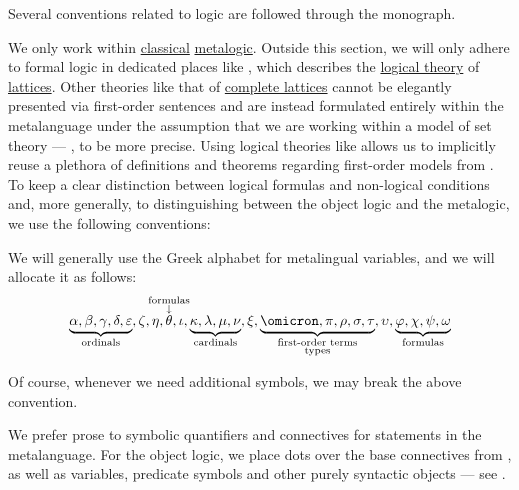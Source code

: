 \begin{remark}\label{rem:mathematical_logic_conventions}
  Several conventions related to logic are followed through the monograph.

  We only work within \hyperref[con:classical_logic]{classical} \hyperref[con:metalogic]{metalogic}. Outside this section, we will only adhere to formal logic in dedicated places like , which describes the \hyperref[def:logical_theory]{logical theory} of \hyperref[def:lattice]{lattices}. Other theories like that of \hyperref[def:complete_lattice]{complete lattices} cannot be elegantly presented via first-order sentences and are instead formulated entirely within the metalanguage under the assumption that we are working within a model of set theory --- \hyperref[def:axiom_of_universes]{}, to be more precise. Using logical theories like  allows us to implicitly reuse a plethora of definitions and theorems regarding first-order models from . To keep a clear distinction between logical formulas and non-logical conditions and, more generally, to distinguishing between the object logic and the metalogic, we use the following conventions:

  \begin{thmenum}
     We will generally use the Greek alphabet for metalingual variables, and we will allocate it as follows:
    \begin{equation*}
      \underbrace{\alpha, \beta, \gamma, \delta, \varepsilon}_{\T{ordinals}},
      \zeta, \eta,
      \overset{ \mathclap{ \substack{ \T{formulas} \\ \downarrow } } }{\theta},
      \iota,
      \underbrace{\kappa, \lambda, \mu, \nu}_{\T{cardinals}},
      \xi,
      \underbrace{\omicron, \pi, \rho, \sigma, \tau}_{\substack{\T{first-order terms} \\ \T{types}}},
      \upsilon,
      \underbrace{\varphi, \chi, \psi, \omega}_{\T{formulas}}
    \end{equation*}

    Of course, whenever we need additional symbols, we may break the above convention.

     We prefer prose to symbolic quantifiers and connectives for statements in the metalanguage. For the object logic, we place dots over the base connectives from , as well as variables, predicate symbols and other purely syntactic objects --- see .


\end{thmenum}
\end{remark}
